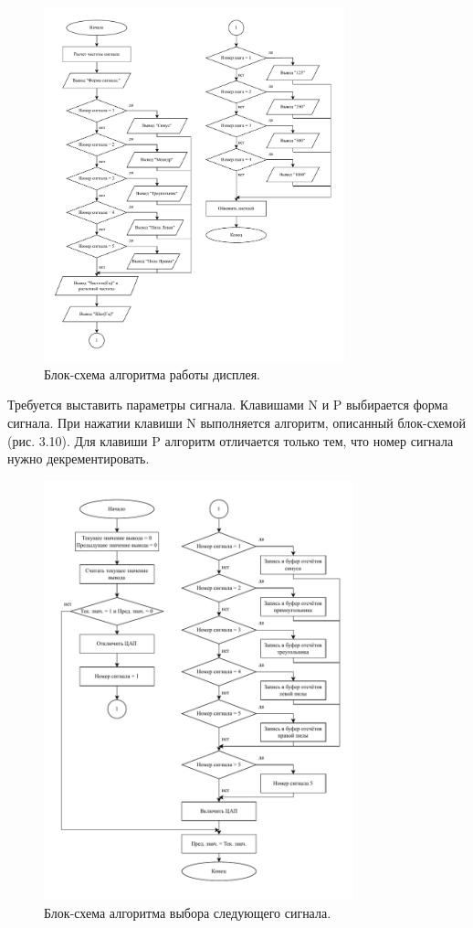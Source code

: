 	\begin{figure}[H]
    \centering
    \includegraphics[width=0.775\textwidth]{../image/display.pdf}
    \caption{Блок-схема алгоритма работы дисплея.}
	\end{figure}	
	
	Требуется выставить параметры сигнала. Клавишами N и P выбирается форма сигнала. При нажатии клавиши N выполняется алгоритм, описанный блок-схемой (рис. 3.10). Для клавиши P алгоритм отличается только тем, что номер сигнала нужно декрементировать.
	
	\begin{figure}[H]
    \centering
    \includegraphics[width=0.8\textwidth]{../image/plus_signal.pdf}
    \caption{Блок-схема алгоритма выбора следующего сигнала.}
	\end{figure}	
	
